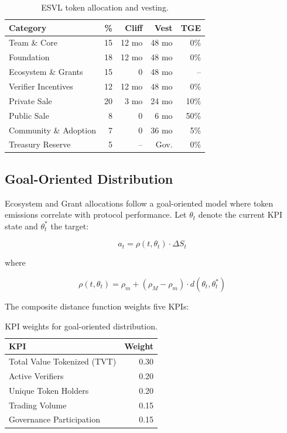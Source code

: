 \documentclass[11pt,a4paper]{article}
\begin{document}
\begin{table}[H]
\centering
\caption{ESVL token allocation and vesting.}
\label{tab:allocation}
\begin{tabular}{lrrrr}
\toprule
\textbf{Category} & \textbf{\%} & \textbf{Cliff} & \textbf{Vest} & \textbf{TGE} \\
\midrule
Team \& Core & 15 & 12 mo & 48 mo & 0\% \\
Foundation & 18 & 12 mo & 48 mo & 0\% \\
Ecosystem \& Grants & 15 & 0 & 48 mo & -- \\
Verifier Incentives & 12 & 12 mo & 48 mo & 0\% \\
Private Sale & 20 & 3 mo & 24 mo & 10\% \\
Public Sale & 8 & 0 & 6 mo & 50\% \\
Community \& Adoption & 7 & 0 & 36 mo & 5\% \\
Treasury Reserve & 5 & -- & Gov. & 0\% \\
\bottomrule
\end{tabular}
\end{table}

\subsection{Goal-Oriented Distribution}

Ecosystem and Grant allocations follow a goal-oriented model where token emissions correlate with protocol performance. Let $\theta_t$ denote the current KPI state and $\theta^*_t$ the target:

\begin{equation}
    a_t = \rho(t, \theta_t) \cdot \Delta S_t
\end{equation}

\noindent where

\begin{equation}
    \rho(t, \theta_t) = \rho_m + (\rho_M - \rho_m) \cdot d(\theta_t, \theta^*_t)
\end{equation}

The composite distance function weights five KPIs:

\begin{table}[H]
\centering
\caption{KPI weights for goal-oriented distribution.}
\begin{tabular}{lr}
\toprule
\textbf{KPI} & \textbf{Weight} \\
\midrule
Total Value Tokenized (TVT) & 0.30 \\
Active Verifiers & 0.20 \\
Unique Token Holders & 0.20 \\
Trading Volume & 0.15 \\
Governance Participation & 0.15 \\
\bottomrule
\end{tabular}
\end{table}
\end{document}
